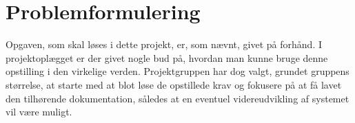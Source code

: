 \documentclass[rapport.tex]{subfiles}
\begin{document}
\section{Problemformulering}\label{problemformulering}

Opgaven, som skal løses i dette projekt, er, som nævnt, givet på forhånd. I projektoplægget er der givet nogle bud på, hvordan man kunne bruge denne opstilling i den virkelige verden. Projektgruppen har dog valgt, grundet gruppens størrelse, at starte med at blot løse de opstillede krav og fokusere på at få lavet den tilhørende dokumentation, således at en eventuel videreudvikling af systemet vil være muligt.
\end{document}
